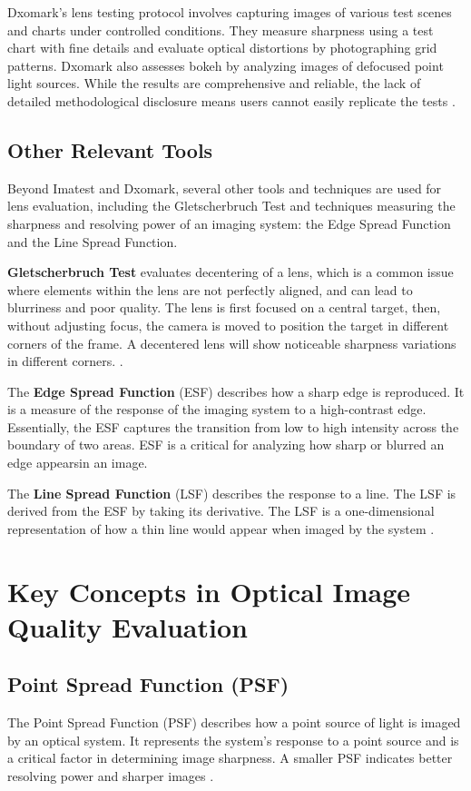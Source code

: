 Dxomark's lens testing protocol involves capturing images of various test scenes and charts under controlled conditions. They measure sharpness using a test chart with fine details and evaluate optical distortions by photographing grid patterns. Dxomark also assesses bokeh by analyzing images of defocused point light sources. While the results are comprehensive and reliable, the lack of detailed methodological disclosure means users cannot easily replicate the tests \cite{DxomarkBokeh}.

\subsection{Other Relevant Tools}
Beyond Imatest and Dxomark, several other tools and techniques are used for lens evaluation, including the Gletscherbruch Test and techniques measuring the sharpness and resolving power of an imaging system: the Edge Spread Function and the Line Spread Function.

\textbf{Gletscherbruch Test} evaluates decentering of a lens, which is a common issue where elements within the lens are not perfectly aligned, and can lead to blurriness and poor quality. The lens is first focused on a central target, then, without adjusting focus, the camera is moved to position the target in different corners of the frame. A decentered lens will show noticeable sharpness variations in different corners. \cite{Gletscherbruch}.

The \textbf{Edge Spread Function} (ESF) describes how a sharp edge is reproduced. It is a measure of the response of the imaging system to a high-contrast edge. Essentially, the ESF captures the transition from low to high intensity across the boundary of two areas. ESF is a critical for analyzing how sharp or blurred an edge appearsin an image.

The \textbf{Line Spread Function} (LSF) describes the response to a line. The LSF is derived from the ESF by taking its derivative. The LSF is a one-dimensional representation of how a thin line would appear when imaged by the system \cite{ESF}.

\section{Key Concepts in Optical Image Quality Evaluation}

\subsection{Point Spread Function (PSF)}
The Point Spread Function (PSF) describes how a point source of light is imaged by an optical system. It represents the system's response to a point source and is a critical factor in determining image sharpness. A smaller PSF indicates better resolving power and sharper images \cite{PSFdescription}.

